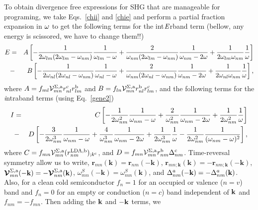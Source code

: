\documentclass[floatfix,prb,aps,superscriptaddress,11pt,preprint]{revtex4}
\begin{document}
To obtain divergence free expressions for SHG that are manageable for
programing, we take Eqs.~\eqref{chii} and \eqref{chie} and perform
a partial fraction  expansion in $\omega$ to get the following terms for
the int$\it E$rband term (bellow, any energy is scissored, we have to
change them!!)
\begin{eqnarray}\label{pfe}  
E&=&  
A
\left[
-\frac{1}{2\omega_{lm}(2\omega_{lm}-\omega_{nm})}\frac{1}{\omega_{lm}-\omega}
+\frac{2}{\omega_{nm}(2\omega_{lm}-\omega_{nm})}\frac{1}{\omega_{nm}-2\omega}
+\frac{1}{2\omega_{lm}\omega_{nm}}\frac{1}{\omega}
\right]
\nonumber\\
&-& 
B
\left[
-\frac{1}{2\omega_{nl}(2\omega_{nl}-\omega_{nm})}\frac{1}{\omega_{nl}-\omega}
+\frac{2}{\omega_{nm}(2\omega_{nl}-\omega_{nm})}\frac{1}{\omega_{nm}-2\omega}
+\frac{1}{2\omega_{nl}\omega_{nm}}\frac{1}{\omega}
\right]
,
\end{eqnarray}  
where 
$A=f_{ml}{\cal V}^{\Sigma,\mathrm{a}}_{mn}r^{\mathrm{c}}_{nl}r^{\mathrm{b}}_{lm}$   
and
$B=f_{ln}{\cal V}^{\Sigma,\mathrm{a}}_{mn}r^{\mathrm{b}}_{nl}r^{\mathrm{c}}_{lm}$,  
and the following terms for the {\it i}ntraband terms
 (using Eq.~\eqref{gene2})
\begin{eqnarray}\label{pfi} 
I&=& 
C
\left[
-\frac{1}{2\omega^2_{nm}}\frac{1}{\omega_{nm}-\omega}
+\frac{2}{\omega^2_{nm}}\frac{1}{\omega_{nm}-2\omega}
+\frac{1}{2\omega^2_{nm}}\frac{1}{\omega}
\right]
\nonumber\\
&-&D
\left[
-\frac{3}{2\omega^3_{nm}}\frac{1}{\omega_{nm}-\omega}
+\frac{4}{\omega^3_{nm}}\frac{1}{\omega_{nm}-2\omega}
+\frac{1}{2\omega^3_{nm}}\frac{1}{\omega}
-\frac{1}{2\omega^2_{nm}}\frac{1}{(\omega_{nm}-\omega)^2}
\right]
,
\end{eqnarray} 
where 
$C=f_{mn}{\cal V}^{\Sigma,\mathrm{a}}_{mn}(r^{\mathrm{LDA},\mathrm{b}}_{nm})_{;k^{\mathrm{c}}}$, 
and
$D=f_{mn}{\cal V}^{\Sigma,\mathrm{a}}_{mn}r^{\mathrm{b}}_{nm}\Delta^{\mathrm{c}}_{nm}$.
Time-reversal symmetry allow us to write,
$\mathbf{r}_{mn}(\mathbf{k})=\mathbf{r}_{nm}(-\mathbf{k})$,
$\mathbf{r}_{mn;\mathbf{k}}(\mathbf{k})=-\mathbf{r}_{nm;\mathbf{k}}(-\mathbf{k})$,
$\boldsymbol{\mathcal{\cal V}}_{mn}^{\Sigma,\mathrm{a}}(-\mathbf{k})=-\boldsymbol{\mathcal{\cal V}}_{nm}^{\Sigma,\mathrm{a}}(\mathbf{k})$,
$\omega_{mn}^{S}(-\mathbf{k})=\omega_{mn}^{S}(\mathbf{k})$,
and
$\Delta^a_{nm}(-\mathbf{k})=-\Delta^a_{nm}(\mathbf{k})$.
Also, for a clean cold semiconductor $f_n=1$  for an occupied or
valence ($n=v$) band and $f_n=0$
for an empty or conduction ($n=c$) band independent of $\mathbf{k}$ and
$f_{nm}=-f_{mn}$. 
Then adding the $\mathbf{k}$ and $-\mathbf{k}$ terms, we
\end{document}
